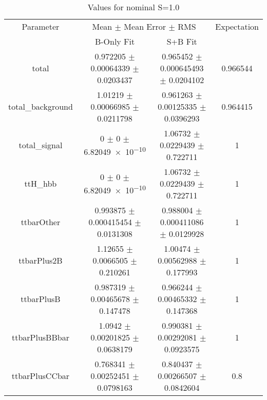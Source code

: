 \begin{table}
\centering
\caption{Values for nominal S=1.0}
\begin{tabular}{cccc}
\toprule
Parameter & \multicolumn{2}{c}{Mean $\pm$ Mean Error $\pm$ RMS} & Expectation\\
 & B-Only Fit & S+B Fit & \\
\midrule
total & \num{0.972205} $\pm$ \num{0.00064339} $\pm$ \num{0.0203437} & \num{0.965452} $\pm$ \num{0.000645493} $\pm$ \num{0.0204102} & \num{0.966544}\\
total\_background & \num{1.01219} $\pm$ \num{0.00066985} $\pm$ \num{0.0211798} & \num{0.961263} $\pm$ \num{0.00125335} $\pm$ \num{0.0396293} & \num{0.964415}\\
total\_signal & \num{0} $\pm$ \num{0} $\pm$ \num{6.82049e-10} & \num{1.06732} $\pm$ \num{0.0229439} $\pm$ \num{0.722711} & \num{1}\\
ttH\_hbb & \num{0} $\pm$ \num{0} $\pm$ \num{6.82049e-10} & \num{1.06732} $\pm$ \num{0.0229439} $\pm$ \num{0.722711} & \num{1}\\
ttbarOther & \num{0.993875} $\pm$ \num{0.000415454} $\pm$ \num{0.0131308} & \num{0.988004} $\pm$ \num{0.000411086} $\pm$ \num{0.0129928} & \num{1}\\
ttbarPlus2B & \num{1.12655} $\pm$ \num{0.0066505} $\pm$ \num{0.210261} & \num{1.00474} $\pm$ \num{0.00562988} $\pm$ \num{0.177993} & \num{1}\\
ttbarPlusB & \num{0.987319} $\pm$ \num{0.00465678} $\pm$ \num{0.147478} & \num{0.966244} $\pm$ \num{0.00465332} $\pm$ \num{0.147368} & \num{1}\\
ttbarPlusBBbar & \num{1.0942} $\pm$ \num{0.00201825} $\pm$ \num{0.0638179} & \num{0.990381} $\pm$ \num{0.00292081} $\pm$ \num{0.0923575} & \num{1}\\
ttbarPlusCCbar & \num{0.768341} $\pm$ \num{0.00252451} $\pm$ \num{0.0798163} & \num{0.840437} $\pm$ \num{0.00266507} $\pm$ \num{0.0842604} & \num{0.8}\\
\bottomrule
\end{tabular}
\end{table}